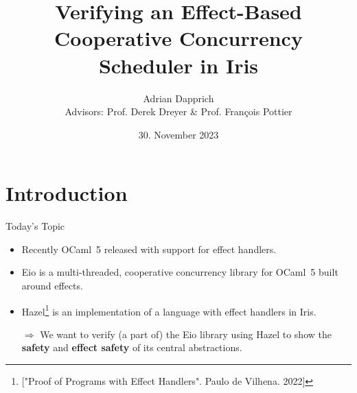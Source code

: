 \documentclass[aspectratio=43]{beamer}
\title{Verifying an Effect-Based Cooperative Concurrency Scheduler in Iris}
\author{Adrian Dapprich\\ Advisors: Prof. Derek Dreyer \& Prof. François Pottier}
\institute{Foundations of Programming Group, MPI-SWS, Saarland University}
\date{30. November 2023}
\newcommand{\ocf}{OCaml~5}
\begin{document}
\frame{\titlepage}

\section{Introduction}


\begin{frame}{Today's Topic}
    \begin{itemize}
        \item Recently \ocf{} released with support for effect handlers.
        \item Eio is a multi-threaded, cooperative concurrency library for \ocf{} built around effects.
        \item Hazel\footnote{["Proof of Programs with Effect Handlers". Paulo de Vilhena. 2022]} is an implementation of a language with effect handlers in Iris.
        \item[\(\Rightarrow\)] We want to verify (a part of) the Eio library using Hazel to show the \textbf{safety} and \textbf{effect safety} of its central abstractions.
    \end{itemize}
\end{frame}
\end{document}
